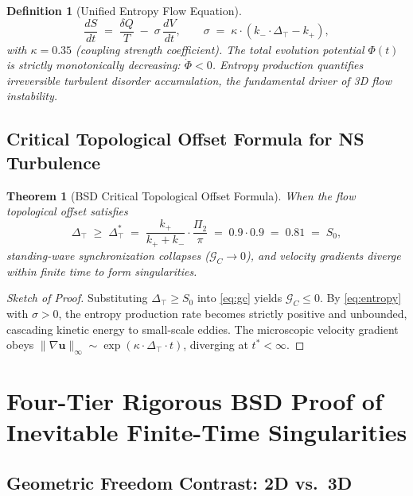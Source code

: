 \documentclass[11pt,a4paper]{article}
\newtheorem{theorem}{Theorem}
\newtheorem{definition}{Definition}
\theoremstyle{remark}
\newcommand{\PiT}{\Pi_{2}}
\newcommand{\kplus}{k_{+}}
\newcommand{\kminus}{k_{-}}
\newcommand{\Szero}{S_{0}}
\newcommand{\GC}{\mathcal{G}_{\!C}}
\newcommand{\Dtop}{\Delta_{\!\top}}
\newcommand{\uvec}{\bm{u}}
\begin{document}
\begin{definition}[Unified Entropy Flow Equation]\label{def:entropy}
\begin{equation}\label{eq:entropy}
\frac{dS}{dt} \;=\; \frac{\delta Q}{T} \;-\; \sigma\,\frac{dV}{dt},
\qquad \sigma \;=\; \kappa\cdot(\kminus\cdot\Dtop - \kplus),
\end{equation}
with $\kappa=0.35$ (coupling strength coefficient). The total evolution potential $\Phi(t)$ is strictly monotonically decreasing: $\dot\Phi<0$. Entropy production quantifies irreversible turbulent disorder accumulation, the fundamental driver of 3D flow instability.
\end{definition}

\subsection{Critical Topological Offset Formula for NS Turbulence}\label{sec:critical}

\begin{theorem}[BSD Critical Topological Offset Formula]\label{thm:critical}
When the flow topological offset satisfies
\begin{equation}\label{eq:critical}
\Dtop \;\ge\; \Dtop^{\!*} \;=\; \frac{\kplus}{\kplus+\kminus}\cdot\frac{\PiT}{\pi} \;=\; 0.9\cdot 0.9 \;=\; 0.81 \;=\; \Szero,
\end{equation}
standing-wave synchronization collapses ($\GC\to 0$), and velocity gradients diverge within finite time to form singularities.
\end{theorem}

\begin{proof}[Sketch of Proof]
Substituting $\Dtop\ge\Szero$ into \eqref{eq:gc} yields $\GC\le 0$. By \eqref{eq:entropy} with $\sigma>0$, the entropy production rate becomes strictly positive and unbounded, cascading kinetic energy to small-scale eddies. The microscopic velocity gradient obeys $\|\nabla\uvec\|_{\infty}\sim\exp(\kappa\cdot\Dtop\cdot t)$, diverging at $t^{*}<\infty$.
\end{proof}

\section{Four-Tier Rigorous BSD Proof of Inevitable Finite-Time Singularities}\label{sec:proof}

\subsection{Geometric Freedom Contrast: 2D vs.\ 3D}\label{sec:geom}
\end{document}
